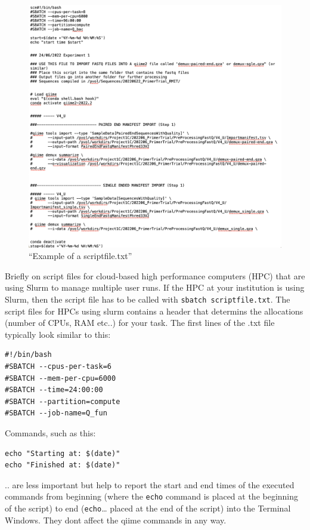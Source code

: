 \documentclass[
]{book}
\begin{document}
\begin{figure}
\centering
\includegraphics{./img/scriptfile.png}
\caption{``Example of a scriptfile.txt''}
\end{figure}

\hfill\break

Briefly on script files for cloud-based high performance computers (HPC) that are using Slurm to manage multiple user runs. If the HPC at your institution is using Slurm, then the script file has to be called with \texttt{sbatch\ scriptfile.txt}. The script files for HPCs using slurm contains a header that determins the allocations (number of CPUs, RAM etc..) for your task. The first lines of the .txt file typically look similar to this:

\begin{verbatim}
#!/bin/bash
#SBATCH --cpus-per-task=6
#SBATCH --mem-per-cpu=6000
#SBATCH --time=24:00:00
#SBATCH --partition=compute
#SBATCH --job-name=Q_fun
\end{verbatim}

Commands, such as this:

\begin{verbatim}
echo "Starting at: $(date)"
echo "Finished at: $(date)"
\end{verbatim}

.. are less important but help to report the start and end times of the executed commands from beginning (where the \texttt{echo} command is placed at the beginning of the script) to end (\texttt{echo}\ldots{} placed at the end of the script) into the Terminal Windows. They dont affect the qiime commands in any way.
\end{document}
